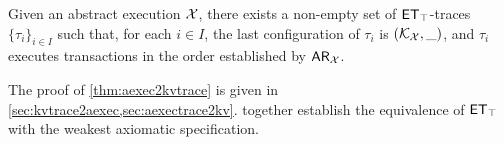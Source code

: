 

\begin{theorem}
\label{thm:aexec2kvtrace}
Given an abstract execution $\mathcal{X}$, there exists a non-empty 
set of $\mathsf{ET}_{\top}$-traces $\{\tau_{i}\}_{i \in I}$ such that, for each $i \in I$, the last configuration of $\tau_{i}$ is 
$(\mathcal{K}_{\mathcal{X}}, \_)$, and $\tau_{i}$ executes transactions in the order established by $\mathsf{AR}_{\mathcal{X}}$. 
\end{theorem}
\noindent The proof of \cref{thm:aexec2kvtrace} is given 
in \cref{sec:kvtrace2aexec,sec:aexectrace2kv}. 
 together establish the
equivalence  of $\mathsf{ET}_{\top}$ with the weakest axiomatic specification. 


